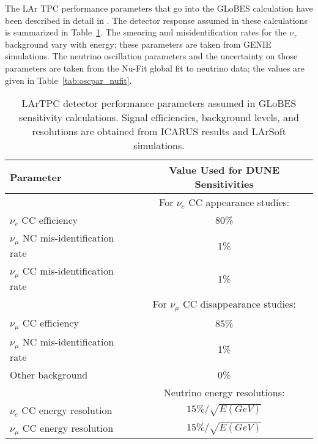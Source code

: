 The LAr TPC performance parameters that go into the GLoBES calculation
have been described in detail in \cite{lbne_sciencebook}. 
The detector response assumed in these calculations
is summarized in Table~\ref{tab:lar-nuosc-totaltable}. 
The smearing and
misidentification rates for the $\nu_{\tau}$ background vary with energy;
these parameters are taken from GENIE simulations. The neutrino oscillation
parameters and the uncertainty on those parameters are taken from the 
Nu-Fit\cite{Gonzalez-Garcia:2014bfa} global fit to neutrino data; the values are given in 
Table~\ref{tab:oscpar_nufit}.

\begin{table}[!hb]
\begin{center}
\caption{LArTPC detector performance parameters assumed in GLoBES sensitivity
  calculations. Signal efficiencies, background levels, and resolutions are 
  obtained from ICARUS results and LArSoft simulations.}
\label{tab:lar-nuosc-totaltable}
\begin{tabular}{l|c} \hline\hline
Parameter &    Value Used for  DUNE Sensitivities\\ \hline\hline
& For $\nu_e$ CC appearance studies: \\ 
$\nu_e$ CC efficiency          & 80\%   \\ 
$\nu_\mu$ NC mis-identification rate  & 1\%   \\ 
$\nu_\mu$ CC mis-identification rate  & 1\%   \\ \hline
& For $\nu_\mu$ CC disappearance studies: \\ 
$\nu_\mu$ CC efficiency          & 85\%   \\ 
$\nu_\mu$ NC mis-identification rate  & 1\%   \\ 
Other background                 & 0\% \\ \hline
& Neutrino energy resolutions: \\ 
$\nu_e$ CC energy resolution & $15\%/\sqrt{E(GeV)}$ \\ 
$\nu_\mu$ CC energy resolution & $15\%/\sqrt{E(GeV)}$ \\ 
\end{tabular}
\end{center}
\end{table}

